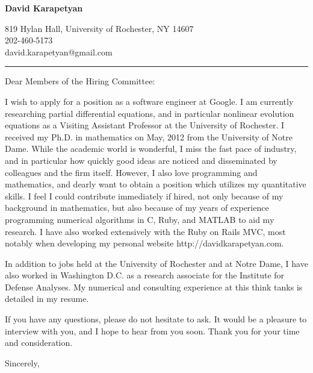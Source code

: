 \documentclass[12pt]{letter}
\date{\vspace{0.5cm}\flushleft}
\begin{document}
\begin{letter}{}
\begin{center}
{\bf {\Large David Karapetyan}}
\end{center}

\begin{center}
{819 Hylan Hall, University of Rochester, NY 14607  \\ 
202-460-5173 \\  david.karapetyan@gmail.com
}
\end{center}
\hrule

\opening{Dear Members of the Hiring Committee:\\}
%
%
I wish to apply for a position as a software engineer at Google. I am currently researching partial differential equations, and in particular nonlinear evolution equations as a Visiting Assistant Professor at the University of Rochester. I received my Ph.D. in mathematics on May, 2012 from the University of Notre Dame. While the academic world is wonderful, I miss the fast pace of industry, and in particular how quickly good ideas are noticed and disseminated by colleagues and the firm itself. However, I also love programming and mathematics, and dearly want to obtain a position which utilizes my quantitative skills. I feel I could contribute immediately if hired, not only because of my background in mathematics, but also because of my years of experience programming numerical algorithms in C, Ruby, and MATLAB to aid my research. I have also worked extensively with the Ruby on Rails MVC, most notably when developing my personal website http://davidkarapetyan.com.

In addition to jobs held at the University of Rochester and at Notre Dame, I have also worked in Washington D.C. as a research associate for the Institute for Defense Analyses. My numerical and consulting experience at this think tanks is detailed in my resume.

If you have any questions, please do not hesitate to ask. It would be a pleasure to interview with you, and I hope to hear from you soon. Thank you for your time and consideration.


\closing{Sincerely,}


\end{letter}
\end{document}
